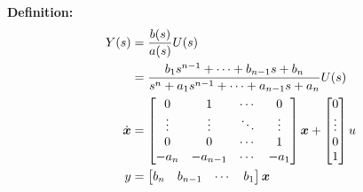 \textbf{Definition:}
	\begin{align}
		Y(s) &= \frac{b(s)}{a(s)} U(s) \\ & = \frac{b_1s^{n-1}+\cdots+b_{n-1}s+b_n}{s^n+a_1s^{n-1}+\cdots + a_{n-1}s+a_n} U(s)\label{eq:uebertragung}\\
		\dot{\boldsymbol{x}} &= 
		\begin{bmatrix}
			0 & 1 & \cdots & 0\\
			\vdots & \vdots & \ddots & \vdots \\
			0&0&\cdots&1\\
			-a_n&-a_{n-1}&\cdots&-a_1
		\end{bmatrix}\boldsymbol{x}+ 
		\begin{bmatrix}
			0 \\ \vdots \\0\\1
		\end{bmatrix} u \\
		y&= \begin{bmatrix}
			b_n & b_{n-1} & \cdots & b_1
		\end{bmatrix} \boldsymbol{x}
	\end{align}

